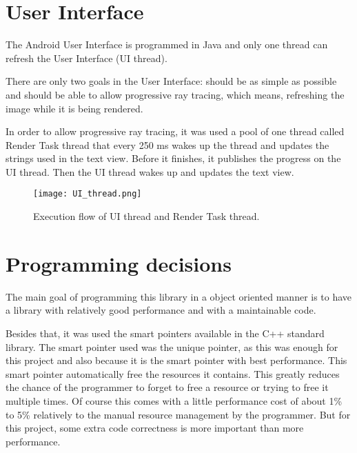 \section{User Interface}

\par
The Android User Interface is programmed in Java and only one thread can refresh the User Interface (UI thread).

\par
There are only two goals in the User Interface: should be as simple as possible and should be able to allow progressive ray tracing, which means, refreshing the image while it is being rendered.

\par
In order to allow progressive ray tracing, it was used a pool of one thread called Render Task thread that every 250 ms wakes up the thread and updates the strings used in the text view.
Before it finishes, it publishes the progress on the UI thread.
Then the UI thread wakes up and updates the text view.

\begin{figure}[H]
	\centering
	\caption{Execution flow of UI thread and Render Task thread.}
	\label{Execution flow of UI thread and Render Task thread}
	\texttt{[image: UI\_thread.png]}
\end{figure}

\section{Programming decisions}

\par
The main goal of programming this library in a object oriented manner is to have a library with relatively good performance and with a maintainable code.

\par
Besides that, it was used the smart pointers available in the C++ standard library.
The smart pointer used was the unique pointer, as this was enough for this project and also because it is the smart pointer with best performance.
This smart pointer automatically free the resources it contains.
This greatly reduces the chance of the programmer to forget to free a resource or trying to free it multiple times.
Of course this comes with a little performance cost of about 1\% to 5\% relatively to the manual resource management by the programmer.
But for this project, some extra code correctness is more important than more performance.

